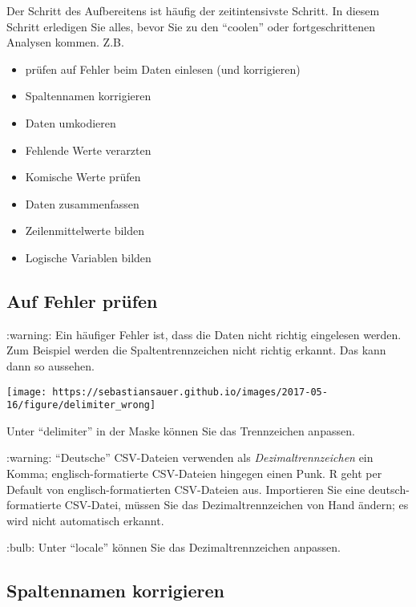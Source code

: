 \documentclass[]{article}
\providecommand{\tightlist}{%
  \setlength{\itemsep}{0pt}\setlength{\parskip}{0pt}}
\begin{document}
Der Schritt des Aufbereitens ist häufig der zeitintensivste Schritt. In
diesem Schritt erledigen Sie alles, bevor Sie zu den ``coolen'' oder
fortgeschrittenen Analysen kommen. Z.B.

\begin{itemize}
\tightlist
\item
  prüfen auf Fehler beim Daten einlesen (und korrigieren)
\item
  Spaltennamen korrigieren
\item
  Daten umkodieren
\item
  Fehlende Werte verarzten
\item
  Komische Werte prüfen
\item
  Daten zusammenfassen
\item
  Zeilenmittelwerte bilden
\item
  Logische Variablen bilden
\end{itemize}

\hypertarget{auf-fehler-prufen}{%
\subsection{Auf Fehler prüfen}\label{auf-fehler-prufen}}

:warning: Ein häufiger Fehler ist, dass die Daten nicht richtig
eingelesen werden. Zum Beispiel werden die Spaltentrennzeichen nicht
richtig erkannt. Das kann dann so aussehen.

\begin{center}\texttt{[image: https://sebastiansauer.github.io/images/2017-05-16/figure/delimiter\_wrong]} \end{center}

Unter ``delimiter'' in der Maske können Sie das Trennzeichen anpassen.

:warning: ``Deutsche'' CSV-Dateien verwenden als
\emph{Dezimaltrennzeichen} ein Komma; englisch-formatierte CSV-Dateien
hingegen einen Punk. R geht per Default von englisch-formatierten
CSV-Dateien aus. Importieren Sie eine deutsch-formatierte CSV-Datei,
müssen Sie das Dezimaltrennzeichen von Hand ändern; es wird nicht
automatisch erkannt.

:bulb: Unter ``locale'' können Sie das Dezimaltrennzeichen anpassen.

\hypertarget{spaltennamen-korrigieren}{%
\subsection{Spaltennamen korrigieren}\label{spaltennamen-korrigieren}}
\end{document}

